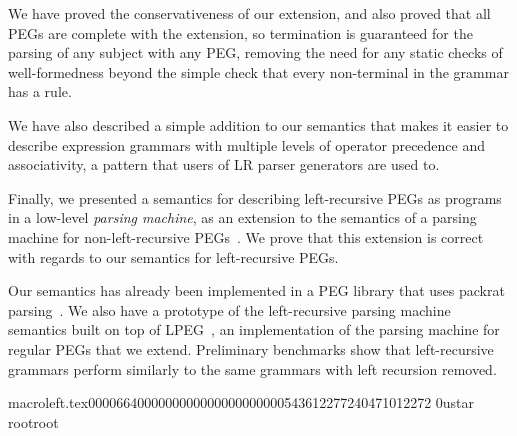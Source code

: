 We have proved the conservativeness of our extension,
and also proved that all PEGs are complete with the extension, so
termination is guaranteed for the parsing of any subject with any PEG,
removing the need for any static checks of well-formedness beyond the
simple check that every non-terminal in the grammar has a rule.

We have also described a simple addition to our semantics that makes
it easier to describe expression grammars with multiple levels of
operator precedence and associativity, a pattern that users of LR
parser generators are used to.

Finally, we presented a semantics for describing left-recursive PEGs
as programs in a low-level {\em parsing machine}, as an extension to
the semantics of a parsing machine for non-left-recursive
PEGs~\cite{dls:lpeg}. We prove that this extension is correct with
regards to our semantics for left-recursive PEGs.

Our semantics has already been implemented in a PEG library that uses
packrat parsing~\cite{ironmeta}. We also have a prototype of the
left-recursive parsing machine semantics built on top of
LPEG~\cite{roberto:lpeg}, an implementation of the parsing machine for
regular PEGs that we extend. Preliminary benchmarks show that
left-recursive grammars perform similarly to the same grammars with
left recursion removed.





                                       macroleft.tex                                                                                       0000664 0000000 0000000 00000005436 12277240471 012272  0                                                                                                    ustar   root                            root                                                                                                                                                                                                                   \newcommand{\Gp}{G^\prime}
\newcommand{\Tup}[2]{(#1,\,#2)}
\newcommand{\Tri}[3]{(#1,\,#2,\,#3)}
\newcommand{\Grm}[4]{(#1,\,#2,\,#3,\,#4)}
\newcommand{\Peg}[2]{#1[#2]}
\newcommand{\Pgg}[1]{\Peg{G}{#1}}
\newcommand{\Mat}[2]{#1\;\,#2\,}
\newcommand{\Matm}[3]{#1\;\,#2\;\,#3\,}
\newcommand{\Lp}{\stackrel{\mbox{\tiny{PEG}}}{\leadsto}}
\newcommand{\Li}{\stackrel{\mbox{\tiny{INC}}}{\leadsto}}
\newcommand{\Matg}[2]{\Mat{\Pgg{#1}}{#2}}
\newcommand{\Matgm}[3]{\Matm{\Pgg{#1}}{#2}{#3}}
\newcommand{\Matgmm}[2]{\Matm{\Pgg{#1}}{#2}{M}}
\newcommand{\Nothing}{{\tt fail}}
\newcommand{\Just}[1]{#1}
\newcommand{\fivespaces}{\;\;\;\;\;}
\newcommand{\tenspaces}{\fivespaces\fivespaces}
\newcommand{\twentyspaces}{\tenspaces\tenspaces}
\newcommand{\thirtyspaces}{\twentyspaces\tenspaces}
\newcommand{\fortyspaces}{\twentyspaces\twentyspaces}
\newcommand{\interf}{\fivespaces}
\newcommand{\mylabel}[1]{\ \mathbf{(#1)}}
\newcommand{\Con}[2]{#1\,#2}
\newcommand{\Choice}[2]{#1\,/\:#2}
\newcommand{\Pcfp}{P_{CFP}}
\newcommand{\Anyx}{X}
\newcommand{\Epsi}{\varepsilon}
\newcommand{\Ps}{p_S}
\newcommand{\Xp}{x^\prime}
\newcommand{\Yp}{y^\prime}

